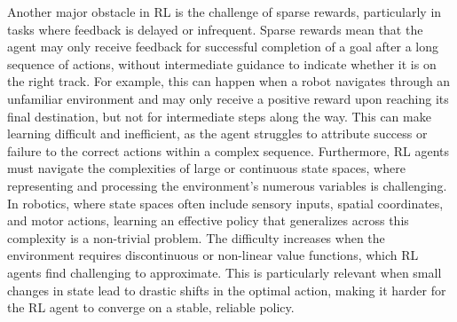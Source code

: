 Another major obstacle in RL is the challenge of sparse rewards, particularly in tasks where feedback is delayed or
infrequent.
Sparse rewards mean that the agent may only receive feedback for successful completion of a goal after a long sequence
of actions, without intermediate guidance to indicate whether it is on the right track.
For example, this can happen when a robot navigates through an unfamiliar environment and may only receive a positive reward upon reaching its
final destination, but not for intermediate steps along the way.
This can make learning difficult and inefficient, as the agent struggles to attribute success or failure to the correct
actions within a complex sequence.
Furthermore, RL agents must navigate the complexities of large or continuous state spaces, where representing and
processing the environment’s numerous variables is challenging.
In robotics, where state spaces often include sensory inputs, spatial coordinates, and motor actions, learning an
effective policy that generalizes across this complexity is a non-trivial problem.
The difficulty increases when the environment requires discontinuous or non-linear value functions, which RL agents
find challenging to approximate.
This is particularly relevant when small changes in state lead to drastic shifts in the optimal action, making it
harder for the RL agent to converge on a stable, reliable policy.

